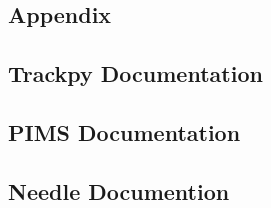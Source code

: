 
\begin{appendices}
\chapter{Appendix}

\section{Trackpy Documentation}
\section{PIMS Documentation}
\section{Needle Documention}

\end{appendices}